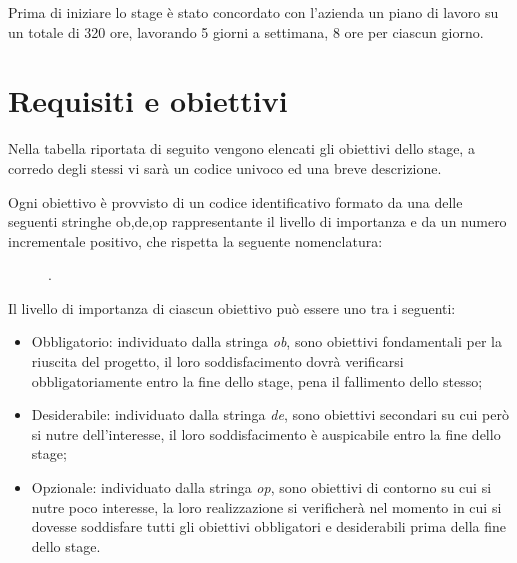 Prima di iniziare lo stage è stato concordato con l'azienda un piano di lavoro su un totale di 320 ore, lavorando 5 giorni a settimana, 8 ore per ciascun giorno. 

\section{Requisiti e obiettivi}
Nella tabella riportata di seguito vengono elencati gli obiettivi dello stage, a corredo degli stessi vi sarà un codice univoco ed una breve descrizione.

Ogni obiettivo è provvisto di un codice identificativo formato da una delle seguenti stringhe ob,de,op rappresentante il livello di importanza e da un numero incrementale positivo, che rispetta la seguente nomenclatura: 
\begin{figure}[htp]
	\centering
	[importanza][identificativo].
\end{figure}

Il livello di importanza di ciascun obiettivo può essere uno tra i seguenti:
\begin{itemize}
	\item Obbligatorio: individuato dalla stringa \textit{ob}, sono obiettivi fondamentali per la riuscita del progetto, il loro soddisfacimento dovrà verificarsi obbligatoriamente entro la fine dello stage, pena il fallimento dello stesso;
	\item Desiderabile: individuato dalla stringa \textit{de}, sono obiettivi secondari su cui però si nutre dell'interesse, il loro soddisfacimento è auspicabile entro la fine dello stage;
	\item Opzionale: individuato dalla stringa \textit{op}, sono obiettivi di contorno su cui si nutre poco interesse, la loro realizzazione si verificherà nel momento in cui si dovesse soddisfare tutti gli obiettivi obbligatori e desiderabili prima della fine dello stage.
\end{itemize}

